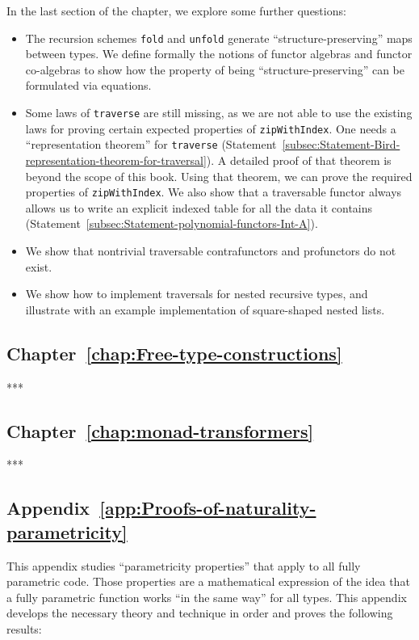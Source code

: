 In the last section of the chapter, we explore some further questions:
\begin{itemize}
\item The recursion schemes \lstinline!fold! and \lstinline!unfold! generate
\textsf{``}structure-preserving\textsf{''} maps between types. We define formally
the notions of functor algebras and functor co-algebras to show how
the property of being \textsf{``}structure-preserving\textsf{''} can be formulated
via equations.
\item Some laws of \lstinline!traverse! are still missing, as we are not
able to use the existing laws for proving certain expected properties
of \lstinline!zipWithIndex!. One needs a \textsf{``}representation theorem\textsf{''}
for \lstinline!traverse! (Statement~\ref{subsec:Statement-Bird-representation-theorem-for-traversal}).
A detailed proof of that theorem is beyond the scope of this book.
Using that theorem, we can prove the required properties of \lstinline!zipWithIndex!.
We also show that a traversable functor always allows us to write
an explicit indexed table for all the data it contains (Statement~\ref{subsec:Statement-polynomial-functors-Int-A}).
\item We show that nontrivial traversable contrafunctors and profunctors
do not exist.
\item We show how to implement traversals for nested recursive types, and
illustrate with an example implementation of square-shaped nested
lists.
\end{itemize}

\subsection{Chapter~\ref{chap:Free-type-constructions}}

{*}{*}{*}

\subsection{Chapter~\ref{chap:monad-transformers}}

{*}{*}{*}

\subsection{Appendix~\ref{app:Proofs-of-naturality-parametricity}}

This appendix studies \textsf{``}parametricity properties\textsf{''} that apply to
all fully parametric code. Those properties are a mathematical expression
of the idea that a fully parametric function works \textsf{``}in the same
way\textsf{''} for all types. This appendix develops the necessary theory
and technique in order and proves the following results:

